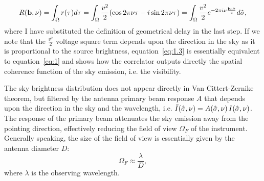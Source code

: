 \begin{equation}
R ({\bf b}, \nu) = \int_\Omega r(\tau) d\tau = \int_\Omega \frac{v^2}{2} (\cos{2\pi \nu \tau} - i\sin{2\pi \nu \tau}) = \int_\Omega \frac{v^2}{2} e^{-2 \pi i \nu \frac{{\bf b} \cdot {\hat {\bf \sigma}}}{c}} d \hat{\bf \sigma},
\label{eq:1.3}
\end{equation}
where I have substituted the definition of geometrical delay in the last step. If we note that the $\frac{v^2}{2}$ voltage square term depends upon the direction in the sky as it is proportional to the source brightness, equation~\ref{eq:1.3} is essentially equivalent to equation~\ref{eq:1} and shows how the correlator outputs directly the spatial coherence function of the sky emission, i.e. the visibility.  

The sky brightness distribution does not appear directly in Van Cittert-Zernike theorem, but filtered by the antenna primary beam response $A$ that depends upon the direction in the sky and the wavelength, i.e. ${\bar I} (\hat{\bf \sigma}, \nu) = A (\hat{\bf \sigma}, \nu)  \, I (\hat{\bf \sigma}, \nu)$. The response of the primary beam attenuates the sky emission away from the pointing direction, effectively reducing the field of view $\Omega_F$ of the instrument. Generally speaking, the size of the field of view is essentially given by the antenna diameter $D$: 
\begin{equation}
\Omega_F \approx \frac{\lambda}{D},
\label{eq:2}
\end{equation}
where $\lambda$ is the observing wavelength.

